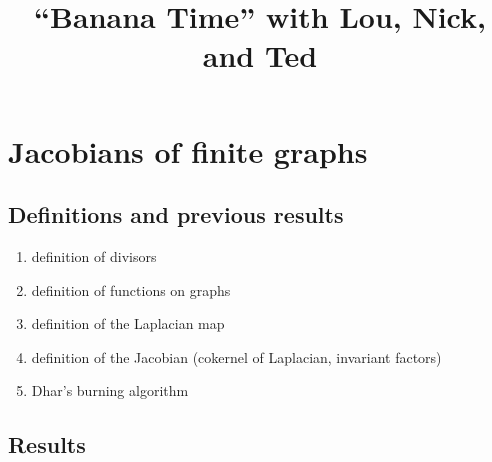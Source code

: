 \documentclass{amsart}
\title{``Banana Time'' with Lou, Nick, and Ted}
\begin{document}
\maketitle

\section{Jacobians of finite graphs}

\subsection{Definitions and previous results}

\begin{enumerate}
\item definition of divisors
\item definition of functions on graphs
\item definition of the Laplacian map
\item definition of the Jacobian (cokernel of Laplacian, invariant
factors)
\item Dhar's burning algorithm
\end{enumerate}

\subsection{Results}
\end{document}
